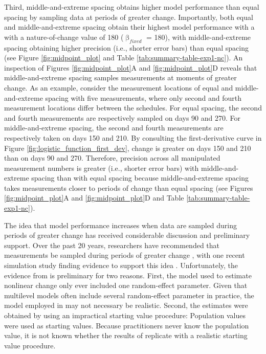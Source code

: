 \documentclass[
12pt, %
twoside,
english]{guelphthesis}
\begin{document}
Third, middle-and-extreme spacing obtains higher model performance than equal spacing by sampling data at periods of greater change. Importantly, both equal and middle-and-extreme spacing obtain their highest model performance with a with a nature-of-change value of 180 (\(\upbeta_{fixed}\) = 180), with middle-and-extreme spacing obtaining higher precision (i.e., shorter error bars) than equal spacing (see Figure \ref{fig:midpoint_plot} and Table \ref{tab:summary-table-exp1-nc}). An inspection of Figures \ref{fig:midpoint_plot}A and \ref{fig:midpoint_plot}D reveals that middle-and-extreme spacing samples measurements at moments of greater change. As an example, consider the measurement locations of equal and middle-and-extreme spacing with five measurements, where only second and fourth measurement locations differ between the schedules. For equal spacing, the second and fourth measurements are respectively sampled on days 90 and 270. For middle-and-extreme spacing, the second and fourth measurements are respectively taken on days 150 and 210. By consulting the first-derivative curve in Figure \ref{fig:logistic_function_first_dev}, change is greater on days 150 and 210 than on days 90 and 270. Therefore, precision across all manipulated measurement numbers is greater (i.e., shorter error bars) with middle-and-extreme spacing than with equal spacing because middle-and-extreme spacing takes measurements closer to periods of change than equal spacing (see Figures \ref{fig:midpoint_plot}A and \ref{fig:midpoint_plot}D and Table \ref{tab:summary-table-exp1-nc}).

The idea that model performance increases when data are sampled during periods of greater change has received considerable discussion and preliminary support. Over the past 20 years, researchers have recommended that measurements be sampled during periods of greater change \autocite{siegler2006,ployhart2010}, with one recent simulation study finding evidence to support this idea \autocite{timmons2015}. Unfortunately, the evidence from \textcite{timmons2015} is preliminary for two reasons. First, the model used to estimate nonlinear change only ever included one random-effect parameter. Given that multilevel models often include several random-effect parameter in practice, the model employed in \textcite{timmons2015} may not necessary be realistic. Second, the estimates were obtained by using an impractical starting value procedure: Population values were used as starting values. Because practitioners never know the population value, it is not known whether the results of \textcite{timmons2015} replicate with a realistic starting value procedure.
\end{document}
